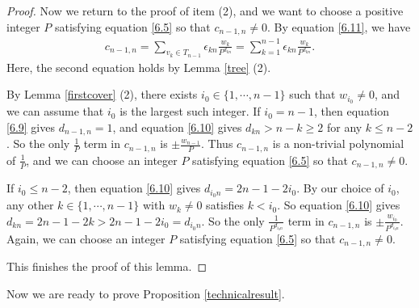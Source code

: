\documentclass{amsart}
\numberwithin{equation}{section}
\theoremstyle{definition}
\begin{document}
\begin{proof}
Now we return to the proof of item (2), and we want to choose a positive integer $P$ satisfying equation \eqref{6.5} so that $c_{n-1,n}\ne 0$. By equation \eqref{6.11}, we have 
\begin{align}\label{6.13}
c_{n-1,n}=\sum_{v_k\in T_{n-1}}\epsilon_{kn}\frac{w_k}{P^{d_{kn}}}=\sum_{k=1}^{n-1}\epsilon_{kn}\frac{w_k}{P^{d_{kn}}}.
\end{align}
Here, the second equation holds by Lemma \ref{tree} (2).

By Lemma \ref{firstcover} (2), there exists $i_0\in \{1,\cdots,n-1\}$ such that $w_{i_0}\ne 0$, and we can assume that  $i_0$ is the largest such integer. If $i_0=n-1$, then equation \eqref{6.9} gives $d_{n-1,n}=1$, and equation \eqref{6.10} gives $d_{kn}> n-k\geq 2$ for any $k\leq n-2$. So the only $\frac{1}{P}$ term in $c_{n-1,n}$ is $\pm\frac{w_{n-1}}{P}$. Thus $c_{n-1,n}$ is a non-trivial polynomial of $\frac{1}{P}$, and we can choose an integer $P$ satisfying equation \eqref{6.5} so that $c_{n-1,n}\ne 0$.

If $i_0\leq n-2$, then equation \eqref{6.10} gives $d_{i_0n}=2n-1-2i_0$. By our choice of $i_0$, any other $k\in \{1,\cdots,n-1\}$ with $w_k\ne 0$ satisfies $k< i_0$. So equation \eqref{6.10} gives $d_{kn}=2n-1-2k>2n-1-2i_0=d_{i_0n}$. So the only $\frac{1}{P^{d_{i_0n}}}$ term in $c_{n-1,n}$ is $\pm\frac{w_{i_0}}{P^{d_{i_0n}}}$. Again, we can choose an integer $P$ satisfying equation \eqref{6.5} so that $c_{n-1,n}\ne 0$.

This finishes the proof of this lemma.
\end{proof}

Now we are ready to prove Proposition \ref{technicalresult}.
\end{document}
